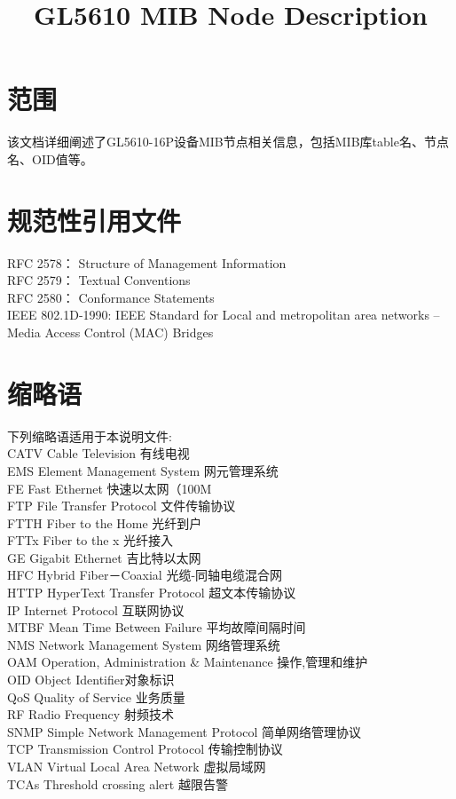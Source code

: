 \documentclass[12pt]{article}
\title{GL5610 MIB Node Description}
\begin{document}
   
\setcounter{secnumdepth}{5}
\begin{CJK*}{UTF8}{song}
\section{范围}
该文档详细阐述了GL5610-16P设备MIB节点相关信息，包括MIB库table名、节点名、OID值等。
\section{规范性引用文件}
RFC 2578： Structure of Management Information \\
RFC 2579： Textual Conventions \\
RFC 2580： Conformance Statements \\
IEEE 802.1D-1990: IEEE Standard for Local and metropolitan area networks -- Media Access Control (MAC) Bridges 
\section{缩略语}
下列缩略语适用于本说明文件: \\
CATV      Cable Television  有线电视 \\
EMS       Element Management System  网元管理系统 \\
FE        Fast Ethernet  快速以太网（100M \\
FTP       File Transfer Protocol  文件传输协议 \\
FTTH      Fiber to the Home  光纤到户 \\
FTTx      Fiber to the x  光纤接入 \\
GE        Gigabit Ethernet  吉比特以太网 \\
HFC       Hybrid Fiber－Coaxial  光缆-同轴电缆混合网 \\ 
HTTP      HyperText Transfer Protocol  超文本传输协议\\
IP        Internet Protocol  互联网协议 \\
MTBF      Mean Time Between Failure  平均故障间隔时间 \\
NMS       Network Management System  网络管理系统 \\
OAM       Operation, Administration \& Maintenance  操作,管理和维护 \\
OID       Object Identifier对象标识 \\
QoS       Quality of Service  业务质量 \\
RF        Radio Frequency  射频技术 \\
SNMP      Simple Network Management Protocol  简单网络管理协议 \\
TCP       Transmission Control Protocol  传输控制协议 \\
VLAN      Virtual Local Area Network  虚拟局域网 \\
TCAs  	  Threshold crossing alert 越限告警 \\
\setcounter{secnumdepth}{5}

\end{CJK*}
\end{document}
